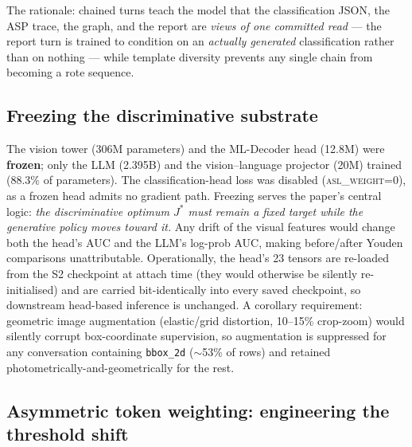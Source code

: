 \documentclass[10pt,a4paper]{article}
\begin{document}
The rationale: chained turns teach the model that the classification JSON, the ASP
trace, the graph, and the report are \emph{views of one committed read} --- the report
turn is trained to condition on an \emph{actually generated} classification rather than
on nothing --- while template diversity prevents any single chain from becoming a rote
sequence.

\subsection{Freezing the discriminative substrate}

The vision tower (306M parameters) and the ML-Decoder head (12.8M) were \textbf{frozen};
only the LLM (2.395B) and the vision--language projector (20M) trained
(88.3\% of parameters). The classification-head loss was disabled
(\textsc{asl\_weight}=0), as a frozen head admits no gradient path. Freezing serves the
paper's central logic: \emph{the discriminative optimum $J^{*}$ must remain a fixed
target while the generative policy moves toward it.} Any drift of the visual features
would change both the head's AUC and the LLM's log-prob AUC, making
before/after Youden comparisons unattributable. Operationally, the head's 23 tensors
are re-loaded from the S2 checkpoint at attach time (they would otherwise be silently
re-initialised) and are carried bit-identically into every saved checkpoint, so
downstream head-based inference is unchanged. A corollary requirement: geometric image
augmentation (elastic/grid distortion, 10--15\% crop-zoom) would silently corrupt
box-coordinate supervision, so augmentation is suppressed for any conversation
containing \texttt{bbox\_2d} ($\sim$53\% of rows) and retained photometrically-and-geometrically for the rest.

\subsection{Asymmetric token weighting: engineering the threshold shift}
\end{document}
